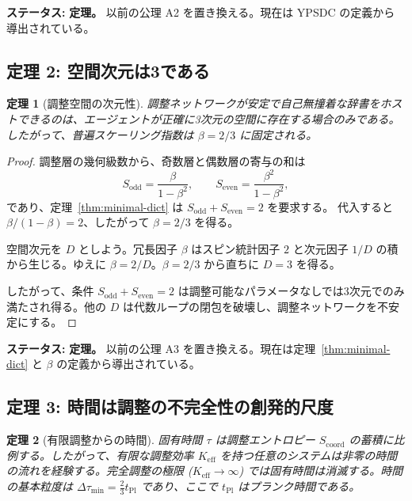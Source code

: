 \documentclass[12pt,a4paper]{article}
\newtheorem{theorem}{定理}[section]
\begin{document}
	\textbf{ステータス:} \textbf{定理。} 以前の公理 A2 を置き換える。現在は YPSDC の定義から導出されている。
	
	\subsection{定理 2: 空間次元は3である}
	
	\begin{theorem}[調整空間の次元性]
		\label{thm:dimension}
		調整ネットワークが安定で自己無撞着な辞書をホストできるのは、エージェントが正確に3次元の空間に存在する場合のみである。したがって、普遍スケーリング指数は \(\beta = 2/3\) に固定される。
	\end{theorem}
	
	\begin{proof}
		調整層の幾何級数から、奇数層と偶数層の寄与の和は
		\[
		S_{\mathrm{odd}} = \frac{\beta}{1-\beta^2}, \qquad
		S_{\mathrm{even}} = \frac{\beta^2}{1-\beta^2},
		\]
		であり、定理~\ref{thm:minimal-dict} は \(S_{\mathrm{odd}} + S_{\mathrm{even}} = 2\) を要求する。
		代入すると \(\beta/(1-\beta) = 2\)、したがって \(\beta = 2/3\) を得る。
		
		空間次元を \(D\) としよう。冗長因子 \(\beta\) はスピン統計因子 \(2\) と次元因子 \(1/D\) の積から生じる。ゆえに \(\beta = 2/D\)。\(\beta = 2/3\) から直ちに \(D = 3\) を得る。
		
		したがって、条件 \(S_{\mathrm{odd}} + S_{\mathrm{even}} = 2\) は調整可能なパラメータなしでは3次元でのみ満たされ得る。他の \(D\) は代数ループの閉包を破壊し、調整ネットワークを不安定にする。
	\end{proof}
	
	\textbf{ステータス:} \textbf{定理。} 以前の公理 A3 を置き換える。現在は定理~\ref{thm:minimal-dict} と \(\beta\) の定義から導出されている。
	
	\subsection{定理 3: 時間は調整の不完全性の創発的尺度}
	
	\begin{theorem}[有限調整からの時間]
		\label{thm:time}
		固有時間 \(\tau\) は調整エントロピー \(S_{\mathrm{coord}}\) の蓄積に比例する。したがって、有限な調整効率 \(K_{\mathrm{eff}}\) を持つ任意のシステムは非零の時間の流れを経験する。完全調整の極限 (\(K_{\mathrm{eff}} \to \infty\)) では固有時間は消滅する。時間の基本粒度は \(\Delta \tau_{\min} = \frac{2}{3} t_{\mathrm{Pl}}\) であり、ここで \(t_{\mathrm{Pl}}\) はプランク時間である。
	\end{theorem}
	
\end{document}
